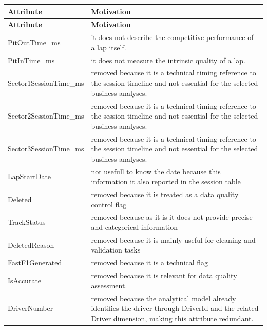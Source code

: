 \documentclass[a4paper,11pt]{article}
\begin{document}
	\begin{longtable}{|p{4.4cm}|p{10.8cm}|}
		\hline
		\textbf{Attribute} & \textbf{Motivation} \\
		\hline
		\endfirsthead
		
		\hline
		\textbf{Attribute} & \textbf{Motivation} \\
		\hline
		\endhead
		
		PitOutTime\_ms & it does not describe the competitive performance of a lap itself. \\ \hline

		PitInTime\_ms & it does not measure the intrinsic quality of a lap. \\ \hline
		
		Sector1SessionTime\_ms & removed because it is a technical timing reference to the session timeline and not essential for the selected business analyses. \\ \hline
		
		Sector2SessionTime\_ms & removed because it is a technical timing reference to the session timeline and not essential for the selected business analyses. \\ \hline
		
		Sector3SessionTime\_ms & removed because it is a technical timing reference to the session timeline and not essential for the selected business analyses. \\ \hline
		
		LapStartDate & not usefull to know the date because this information it also reported in the session table  \\ \hline
		
		Deleted & removed because it is treated as a data quality control flag \\ \hline
		
		TrackStatus & removed because as it is it does not provide precise and categorical information \\ \hline
		
		DeletedReason & removed because it is mainly useful for cleaning and validation tasks\\ \hline
		
		FastF1Generated & removed because it is a technical flag  \\ \hline
		
		IsAccurate & removed because it is relevant for data quality assessment. \\ \hline
		
		DriverNumber & removed because the analytical model already identifies the driver through DriverId and the related Driver dimension, making this attribute redundant. \\ \hline
		

\end{longtable}
\end{document}
